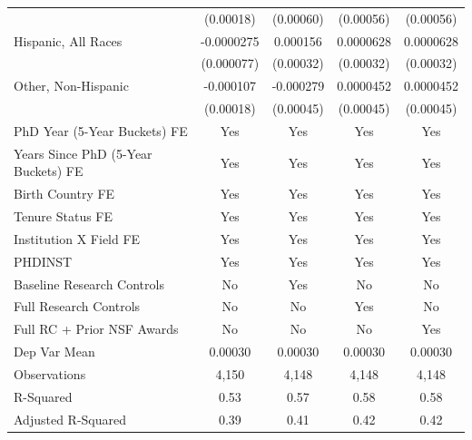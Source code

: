 \begin{table}[htbp]
\begin{tabular}{l*{4}{c}}
  &   (0.00018)         &   (0.00060)         &   (0.00056)         &   (0.00056)         \\
[1em]
Hispanic, All Races&  -0.0000275         &    0.000156         &   0.0000628         &   0.0000628         \\
  &  (0.000077)         &   (0.00032)         &   (0.00032)         &   (0.00032)         \\
[1em]
Other, Non-Hispanic&   -0.000107         &   -0.000279         &   0.0000452         &   0.0000452         \\
  &   (0.00018)         &   (0.00045)         &   (0.00045)         &   (0.00045)         \\
[1em]
PhD Year (5-Year Buckets) FE&         Yes         &         Yes         &         Yes         &         Yes         \\
[1em]
Years Since PhD (5-Year Buckets) FE&         Yes         &         Yes         &         Yes         &         Yes         \\
[1em]
Birth Country FE&         Yes         &         Yes         &         Yes         &         Yes         \\
[1em]
Tenure Status FE&         Yes         &         Yes         &         Yes         &         Yes         \\
[1em]
Institution X Field FE&         Yes         &         Yes         &         Yes         &         Yes         \\
[1em]
PHDINST&         Yes         &         Yes         &         Yes         &         Yes         \\
\hline
Baseline Research Controls&          No         &         Yes         &          No         &          No         \\
Full Research Controls&          No         &          No         &         Yes         &          No         \\
Full RC + Prior NSF Awards&          No         &          No         &          No         &         Yes         \\
Dep Var Mean&     0.00030         &     0.00030         &     0.00030         &     0.00030         \\
Observations&       4,150         &       4,148         &       4,148         &       4,148         \\
R-Squared&        0.53         &        0.57         &        0.58         &        0.58         \\
Adjusted R-Squared&        0.39         &        0.41         &        0.42         &        0.42         \\

\end{tabular}
\end{table}
